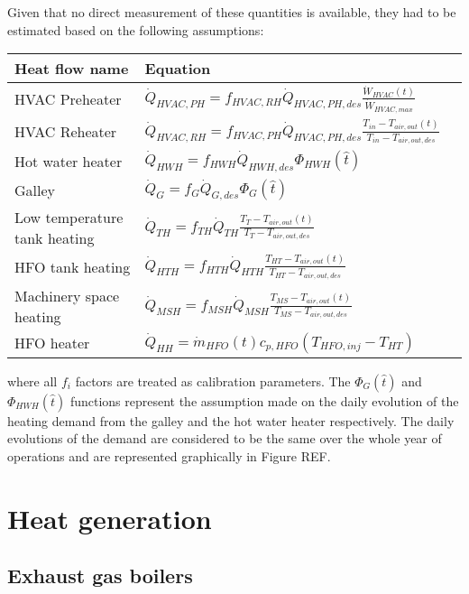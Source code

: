 \documentclass[]{article}
\begin{document}
Given that no direct measurement of these quantities is available, they had to be estimated based on the following assumptions:
\begin{table}
	\centering
	\begin{tabular}{p{3cm}lp{1.6cm}}
		\hline 
		Heat flow name & Equation \\
		\hline
		HVAC Preheater & $\dot{Q}_{HVAC,PH} = f_{HVAC,RH} \dot{Q}_{HVAC,PH,des} \frac{\dot{W}_{HVAC}(t)}{\dot{W}_{HVAC,max}} $ \\
		HVAC Reheater &	$\dot{Q}_{HVAC,RH} = f_{HVAC,PH} \dot{Q}_{HVAC,PH,des} \frac{T_{in} - T_{air,out}(t)}{T_{in} - T_{air,out,des}}$ \\
		Hot water heater& $\dot{Q}_{HWH} = f_{HWH} \dot{Q}_{HWH,des} \Phi_{HWH}(\hat{t})$ \\
		Galley & $\dot{Q}_{G} = f_{G} \dot{Q}_{G,des} \Phi_G(\hat{t})$ \\
		Low temperature tank heating & $\dot{Q}_{TH} = f_{TH} \dot{Q}_{TH} \frac{T_{T} - T_{air,out}(t)}{T_{T} -T_{air,out,des}}$ \\
		HFO tank heating & $\dot{Q}_{HTH} = f_{HTH} \dot{Q}_{HTH} \frac{T_{HT} - T_{air,out}(t)}{T_{HT} - T_{air,out,des}}$ \\
		Machinery space heating & $\dot{Q}_{MSH} = f_{MSH} \dot{Q}_{MSH} \frac{T_{MS} - T_{air,out}(t)}{T_{MS} - T_{air,out,des}}$ \\
		HFO heater & $\dot{Q}_{HH} = \dot{m}_{HFO}(t) c_{p,HFO} (T_{HFO,inj} - T_{HT})$ \\
		\hline
	\end{tabular}
\end{table}

where all $f_i$ factors are treated as calibration parameters. The $\Phi_G(\hat{t})$ and $\Phi_{HWH}(\hat{t})$ functions represent the assumption made on the daily evolution of the heating demand from the galley and the hot water heater respectively. The daily evolutions of the demand are considered to be the same over the whole year of operations and are represented graphically in Figure REF.



\section{Heat generation}

\subsection{Exhaust gas boilers}
\end{document}
